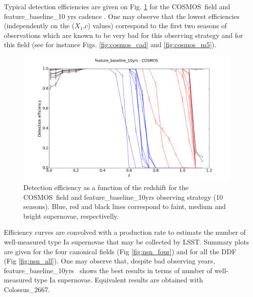 \documentclass [11pt,a4paper]{article}
\newcommand{\cosmos}{COSMOS}
\newcommand{\feature}{feature\_baseline\_10yrs}
\newcommand{\strech}{$X_1$}
\newcommand{\sncolor}{$c$}
\begin{document}
Typical detection efficiencies are given on Fig. \ref{fig:effi} for the \cosmos~field and feature\_baseline\_10 yrs cadence . One may observe that the lowest efficiencies (independently on the (\strech,\sncolor) values) correspond to the first two seasons of observations which are known to be very bad for this observing strategy and for this field (see for instance Figs. \ref{fig:cosmos_cad} and \ref{fig:cosmos_m5}).

\begin{figure}[htbp]
\begin{center}
  
  \includegraphics[width=12cm]{Figures/effi_feature_cosmos.png}
 \caption{Detection efficiency as a function of the redshift for the \cosmos~field and feature\_baseline\_10yrs observing strategy (10 seasons). Blue, red and black lines correspond to faint, medium and bright supernovae, respectivelly.}\label{fig:effi}
\end{center}
\end{figure}

Efficiency curves are convolved with a production rate \cite{perrett} to estimate the number of well-measured type Ia supernovae that may be collected by LSST. Summary plots are given for the four canonical fields (Fig \ref{fig:nsn_four}) and for all the DDF (Fig \ref{fig:nsn_all}). One may observe that, despite bad observing years, \feature~ shows the best results in terms of number of well-measured type Ia supernovae. Equivalent results are obtained with Colossus\_2667.
\end{document}

